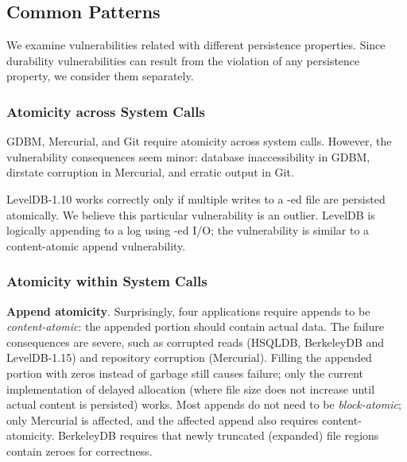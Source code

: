 \subsection{Common Patterns}
\label{sec-patterns}

We examine vulnerabilities related with different persistence properties. 
Since durability vulnerabilities can result from the violation of any persistence
property, we consider them separately. 

\subsubsection{Atomicity across System Calls} 

GDBM, Mercurial, and Git require atomicity across system calls. However, the vulnerability
consequences seem minor: database inaccessibility in GDBM, dirstate corruption
in Mercurial, and erratic  output in Git.

LevelDB-1.10 works correctly only if multiple writes to a -ed
file are persisted atomically. We believe this particular vulnerability is an
outlier.  LevelDB is logically appending to a log using -ed
I/O; the vulnerability is similar to a content-atomic append vulnerability.

\subsubsection{Atomicity within System Calls} 

\textbf{Append atomicity}. Surprisingly, four applications require appends to be
\textit{content-atomic}: the appended portion should contain actual data. The
failure consequences are severe, such as corrupted reads (HSQLDB, BerkeleyDB
and LevelDB-1.15) and repository corruption (Mercurial). Filling the appended
portion with zeros instead of garbage still causes failure; only the current
implementation of delayed allocation (where file size does not increase until
actual content is persisted) works. Most appends do not need to be
\textit{block-atomic}; only Mercurial is affected, and the affected append also
requires content-atomicity. BerkeleyDB requires that newly truncated (expanded)
file regions contain zeroes for correctness.

